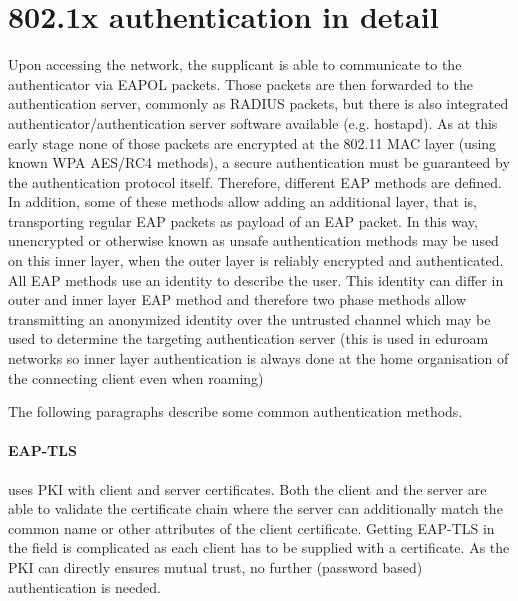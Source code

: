 \documentclass[12pt,a4paper]{scrartcl}
\begin{document}
\section{802.1x authentication in detail}
Upon accessing the network, the supplicant is able to communicate to the authenticator via EAPOL packets. Those packets are then forwarded to the authentication server, commonly as RADIUS packets, but there is also integrated authenticator/authentication server software available (e.g. hostapd).
As at this early stage none of those packets are encrypted at the 802.11 MAC layer (using known WPA AES/RC4 methods), a secure authentication must be guaranteed by the authentication protocol itself.
Therefore, different EAP methods are defined.
In addition, some of these methods allow adding an additional layer, that is, transporting regular EAP packets as payload of an EAP packet.
In this way, unencrypted or otherwise known as unsafe authentication methods may be used on this inner layer, when the outer layer is reliably encrypted and authenticated.
All EAP methods use an identity to describe the user.
This identity can differ in outer and inner layer EAP method and therefore two phase methods allow transmitting an anonymized identity over the untrusted channel which may be used to determine the targeting authentication server (this is used in eduroam networks so inner layer authentication is always done at the home organisation of the connecting client even when roaming)

The following paragraphs describe some common authentication methods.

\paragraph{EAP-TLS} uses PKI with client and server certificates.
Both the client and the server are able to validate the certificate chain where the server can additionally match the common name or other attributes of the client certificate.
Getting EAP-TLS in the field is complicated as each client has to be supplied with a certificate.
As the PKI can directly ensures mutual trust, no further (password based) authentication is needed.
\end{document}
